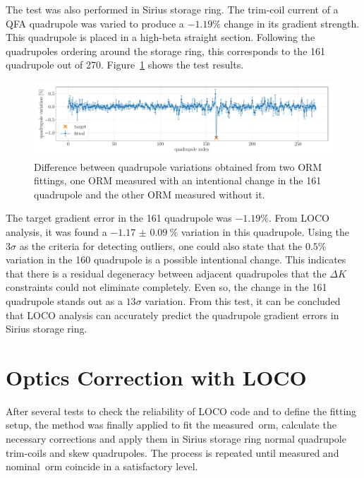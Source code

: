 The test was also performed in Sirius storage ring. The trim-coil current of a QFA quadrupole was varied to produce a $-1.19\%$ change in its gradient strength. This quadrupole is placed in a high-beta straight section. Following the quadrupoles ordering around the storage ring, this corresponds to the 161 quadrupole out of 270. Figure~\ref{fig:delta_13M1_qfa} shows the test results.
\begin{figure}
\centering
\includegraphics[width=1.0\textwidth]{figures/delta_13M1_QFA_errorbar.pdf}
\caption{Difference between quadrupole variations obtained from two ORM fittings, one ORM measured with an intentional change in the 161 quadrupole and the other ORM measured without it.}
\label{fig:delta_13M1_qfa}
\end{figure}

The target gradient error in the 161 quadrupole was $-1.19\%$. From LOCO analysis, it was found a $\SI{-1.17(9)}{\%}$ variation in this quadrupole. Using the $3\sigma$ as the criteria for detecting outliers, one could also state that the $0.5\%$ variation in the 160 quadrupole is a possible intentional change. This indicates that there is a residual degeneracy between adjacent quadrupoles that the $\Delta K$ constraints could not eliminate completely. Even so, the change in the 161 quadrupole stands out as a $13\sigma$ variation. From this test, it can be concluded that LOCO analysis can accurately predict the quadrupole gradient errors in Sirius storage ring. 

\section{Optics Correction with LOCO}\label{sec:orm_fit}
After several tests to check the reliability of LOCO code and to define the fitting setup, the method was finally applied to fit the measured~\gls{orm}, calculate the necessary corrections and apply them in Sirius storage ring normal quadrupole trim-coils and skew quadrupoles. The process is repeated until measured and nominal~\gls{orm} coincide in a satisfactory level.

